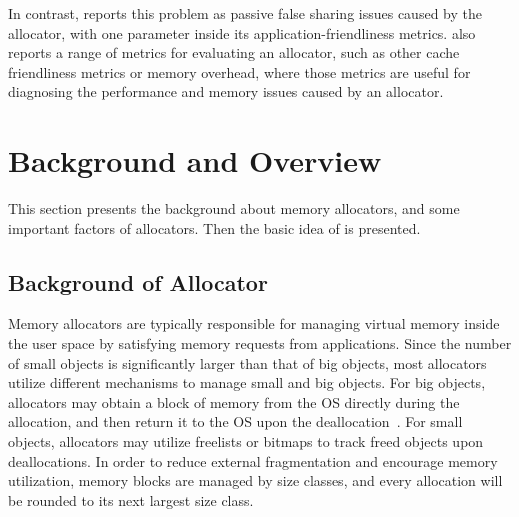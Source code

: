 In contrast, \MP{} reports this problem as passive false sharing issues caused by the allocator, with one parameter inside its application-friendliness metrics. \MP{} also reports a range of metrics for evaluating an allocator, such as other cache friendliness metrics or memory overhead, where those metrics are useful for diagnosing the performance and memory issues caused by an allocator.     

\section{Background and Overview}
\label{sec:background}

This section presents the background about memory allocators, and some important factors of allocators. Then the basic idea of \MP{} is presented. 

\subsection{Background of Allocator}

\label{sec:allocator}
Memory allocators are typically responsible for managing virtual memory inside the user space by satisfying memory requests from applications. Since the number of small objects is significantly larger than that of big objects, most allocators utilize different mechanisms to manage small and big objects. For big objects, allocators may obtain a block of memory from the OS directly during the allocation, and then return it to the OS upon the deallocation~\cite{Hoard}. For small objects, allocators may utilize freelists or bitmaps to track freed objects upon deallocations. In order to reduce external fragmentation and encourage memory utilization, memory blocks are managed by size classes, and every allocation will be rounded to its next largest size class.  

